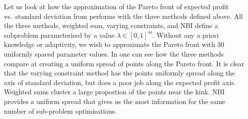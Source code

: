 \documentclass[main.tex]{subfiles}
\begin{document}
\begin{example}
  Let us look at how the approximation of the Pareto front of
  expected profit vs.~standard deviation from 
  performs with the three methods defined above.
  All the three methods, weighted sum, varying constraints, and NBI define
  a subproblem parameterised by a value $\lambda\in{[0,1]}^{m}$. Without any
  a priori knowledge or adaptivity, we wish to approximate the Pareto front
  with 30 uniformly spaced parameter values.
  In  one can see how the three
  methods compare at creating a uniform spread of points along the
  Pareto front. It is clear that the varying constraint method has the
  points uniformly spread along the axis of standard deviation, but
  does a poor job along the expected profit axis.
  Weighted sums cluster a large proportion of the points near the
  kink. NBI provides a uniform spread that gives us the most
  information for the same number of sub-problem optimisations.


\end{example}
\end{document}
